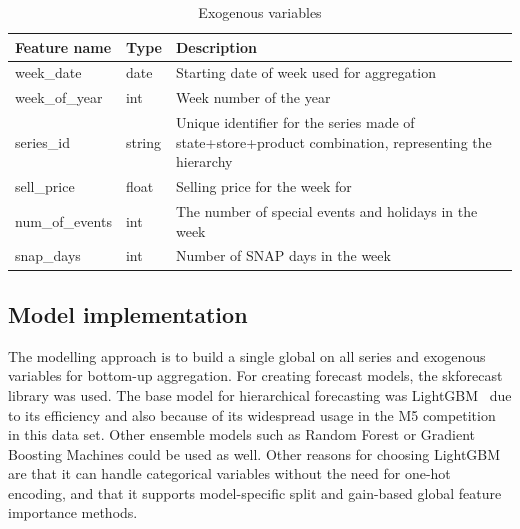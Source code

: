 \begin{table}
    \begin{tabular}{
        |p{} %
        |p{}  %
        |p{}  %
        |}
        \hline
        Feature name    & Type   & Description                                                                                          \\
        \hline
        week\_date      & date   & Starting date of week used for aggregation                                                           \\
        \hline
        week\_of\_year  & int    & Week number of the year                                                                              \\
        \hline
        series\_id      & string & Unique identifier for the series made of state+store+product combination, representing the hierarchy \\
        \hline
        sell\_price     & float  & Selling price for the week for                                                                       \\
        \hline
        num\_of\_events & int    & The number of special events and holidays in the week                                                \\
        \hline
        snap\_days      & int    & Number of SNAP days in the week                                                                      \\
        \hline
    \end{tabular}
    \caption{Exogenous variables}
    \label{tab:exog_data_structure}
\end{table}

\subsection{Model implementation}\label{subsec:model-implementation}
The modelling approach is to build a single global on all series and exogenous variables for bottom-up aggregation.
For creating forecast models, the skforecast\cite{skforecast} library was used.
The base model for hierarchical forecasting was LightGBM~\cite{guolin_ke_highly_2017}
 due to its efficiency and also because of its widespread usage in the M5 competition in this data set\cite{makridakis_m5_2022}.
Other ensemble models such as Random Forest or Gradient Boosting Machines could be used as well.
Other reasons for choosing LightGBM are that it can handle categorical variables without the need for one-hot encoding, and that it supports model-specific split and gain-based global feature importance methods.

